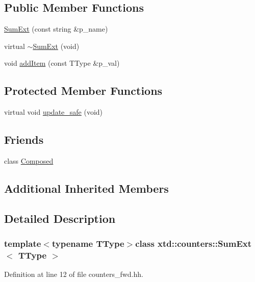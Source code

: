 \subsection*{Public Member Functions}
\begin{DoxyCompactItemize}
\item 
\hyperlink{classxtd_1_1counters_1_1SumExt_aeed4a5cca01073d91a3c24212618ab9e}{Sum\-Ext} (const string \&p\-\_\-name)
\item 
virtual \hyperlink{classxtd_1_1counters_1_1SumExt_a304ba48e158f8f75120b9449300c688a}{$\sim$\-Sum\-Ext} (void)
\item 
void \hyperlink{classxtd_1_1counters_1_1SumExt_a05b01643f8724ccdfd98f8a3209dc99c}{add\-Item} (const T\-Type \&p\-\_\-val)
\end{DoxyCompactItemize}
\subsection*{Protected Member Functions}
\begin{DoxyCompactItemize}
\item 
virtual void \hyperlink{classxtd_1_1counters_1_1SumExt_a1f3c5d348aa4b16104027fb2175acbe6}{update\-\_\-safe} (void)
\end{DoxyCompactItemize}
\subsection*{Friends}
\begin{DoxyCompactItemize}
\item 
class \hyperlink{classxtd_1_1counters_1_1SumExt_a93e934ad70d5b32b14beed5572450abf}{Composed}
\end{DoxyCompactItemize}
\subsection*{Additional Inherited Members}


\subsection{Detailed Description}
\subsubsection*{template$<$typename T\-Type$>$class xtd\-::counters\-::\-Sum\-Ext$<$ T\-Type $>$}



Definition at line 12 of file counters\-\_\-fwd.\-hh.



